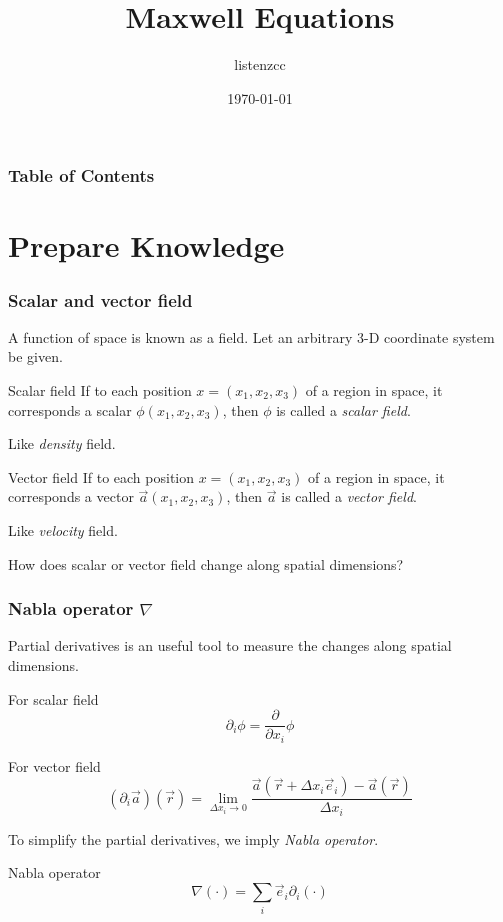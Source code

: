 \documentclass{beamer}
\title{Maxwell Equations}
\author{listenzcc}
\institute{NICA}
\date{\today}
\begin{document}
\frame{\titlepage}

\begin{frame}
    \frametitle{Table of Contents}
    \tableofcontents
\end{frame}

\section{Prepare Knowledge}

\begin{frame}
    \frametitle{Scalar and vector field}
    A function of space is known as a field.
    Let an arbitrary 3-D coordinate system be given.

    \begin{block}{Scalar field}
        If to each position $x = (x_{1}, x_{2}, x_{3})$ of a region in space, it corresponds a scalar $\phi (x_{1}, x_{2}, x_{3})$, then $\phi$ is called a \emph{scalar field}.

        Like \emph{density} field.
    \end{block}

    \begin{block}{Vector field}
        If to each position $x = (x_{1}, x_{2}, x_{3})$ of a region in space, it corresponds a vector $\vec{a} (x_{1}, x_{2}, x_{3})$, then $\vec{a}$ is called a \emph{vector field}.

        Like \emph{velocity} field.
    \end{block}

    \pause
    How does scalar or vector field change along spatial dimensions?
\end{frame}

\begin{frame}
    \frametitle{Nabla operator $\nabla$}
    Partial derivatives is an useful tool to measure the changes along spatial dimensions.

    For scalar field
    \begin{equation}
        \partial_{i} \phi = \frac{\partial}{\partial x_{i}} \phi
    \end{equation}

    For vector field
    \begin{equation}
        (\partial_{i} \vec{a}) (\vec{r}) = \lim_{\Delta x_{i} \rightarrow 0} \frac{\vec{a}(\vec{r} + \Delta x_{i} \vec{e}_{i}) - \vec{a}(\vec{r})}{\Delta x_{i}}
    \end{equation}

    To simplify the partial derivatives, we imply \emph{Nabla operator}.
    \begin{alertblock}{Nabla operator}
    \begin{equation}
        \nabla (\cdot) = \sum_{i} \vec{e}_{i} \partial_{i} (\cdot)
    \end{equation}
    \end{alertblock}

\end{frame}
\end{document}
